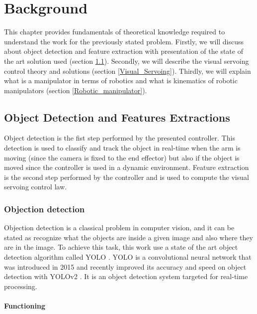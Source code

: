 
\chapter{Background}
\label{chapter:Background}

This chapter provides fundamentals of theoretical knowledge required to understand the work for the previously stated problem. Firstly, we will discuss about object detection and feature extraction with presentation of the state of the art solution used (section \ref{Object_detection}). Secondly, we will describe the visual servoing control theory and solutions (section \ref{Visual_Servoing}). Thirdly, we will explain what is a manipulator in terms of robotics and what is kinematics of robotic manipulators (section \ref{Robotic_manipulator}).

\section{Object Detection and Features Extractions}
\label{Object_detection}

Object detection is the fist step performed by the presented controller. This detection is used to classify and track the object in real-time when the arm is moving (since the camera is fixed to the end effector) but also if the object is moved since the controller is used in a dynamic environment. Feature extraction is the second step performed by the controller and is used to compute the visual servoing control law.

\subsection{Objection detection}

Objection detection is a classical problem in computer vision, and it can be stated as recognize what the objects are inside a given image and also where they are in the image. To achieve this task, this work use a state of the art object detection algorithm called \gls{YOLO} \cite{DBLP:journals/corr/RedmonDGF15}.
\gls{YOLO} is a convolutional neural network that was introduced in 2015 and recently improved its accuracy and speed on object detection with YOLOv2 \cite{DBLP:journals/corr/RedmonF16}. It is an object detection system targeted for real-time processing. 

\subsubsection{Functioning}

